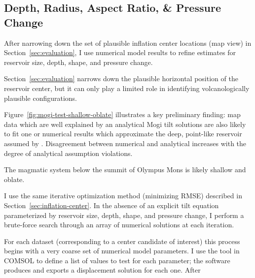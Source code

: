 \subsection{Depth, Radius, Aspect Ratio, \& Pressure Change}

After narrowing down the set of plausible inflation center locations (map view) in Section~\ref{sec:evaluation}, I use numerical model results to refine estimates for reservoir size, depth, shape, and pressure change.

Section~\ref{sec:evaluation} narrows down the plausible horizontal position of the reservoir center, but it can only play a limited role in identifying volcanologically plausible configurations.

Figure~\ref{fig:mogi-test-shallow-oblate} illustrates a key preliminary finding: map data which are well explained by an analytical Mogi tilt solutions are also likely to fit one or numerical results which approximate the deep, point-like reservoir assumed by \textcite{mogi_relations_1958}. Disagreement between numerical and analytical increases with the degree of analytical assumption violations.

The magmatic system below the summit of Olympus Mons is likely shallow and oblate. 

I use the same iterative optimization method (minimizing \acs{RMSE}) described in Section~\ref{sec:inflation-center}. In the absence of an explicit tilt equation parameterized by reservoir size, depth, shape, and pressure change, I perform a brute-force search through an array of numerical solutions at each iteration.

For each dataset (corresponding to a center candidate of interest) this process begins with a very coarse set of numerical model parameters. I use the  tool in COMSOL to define a list of values to test for each parameter; the software produces and exports a displacement solution for each one. After